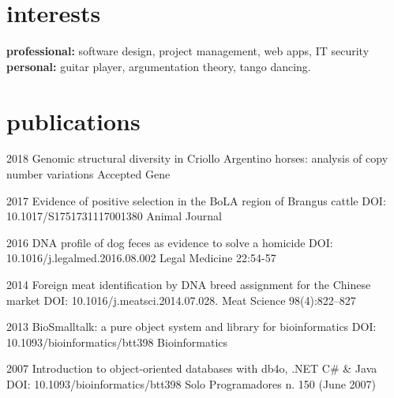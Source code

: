 \documentclass[]{friggeri-cv} %
\begin{document}
\section{interests}

\textbf{professional:} software design, project management, web apps, IT security 
\textbf{personal:} guitar player, argumentation theory, tango dancing.


\section{publications}


\begin{entrylist}

\entry
{2018}
{Genomic structural diversity in Criollo Argentino horses: analysis of copy number variations}
{Accepted}
{Gene}

\entry
{2017}
{Evidence of positive selection in the BoLA region of Brangus cattle}
{DOI: 10.1017/S1751731117001380}
{Animal Journal}

\entry
{2016}
{DNA profile of dog feces as evidence to solve a homicide}
{DOI: 10.1016/j.legalmed.2016.08.002}
{Legal Medicine 22:54-57}

\entry
{2014}
{Foreign meat identification by DNA breed assignment for the Chinese market}
{DOI: 10.1016/j.meatsci.2014.07.028.}
{Meat Science 98(4):822–827}

\entry
{2013}
{BioSmalltalk: a pure object system and library for bioinformatics}
{DOI: 10.1093/bioinformatics/btt398}
{Bioinformatics}

\entry
{2007}
{Introduction to object-oriented databases with db4o, .NET C\# \& Java}
{DOI: 10.1093/bioinformatics/btt398}
{Solo Programadores n. 150 (June 2007)}


\end{entrylist}


\begin{refsection} %
\nocite{*}
\printbibliography[sorting=chronological, type=inproceedings, title={international peer-reviewed conferences/proceedings}, notkeyword={france}, heading=bibheading]
\end{refsection}
\end{document}
